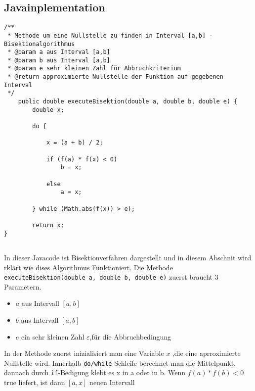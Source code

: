 \subsection{Javainplementation}
\begin{verbatim}
/**
 * Methode um eine Nullstelle zu finden in Interval [a,b] - Bisektionalgorithmus
 * @param a aus Interval [a,b]
 * @param b aus Interval [a,b]
 * @param e sehr kleinen Zahl für Abbruchkriterium
 * @return approximierte Nullstelle der Funktion auf gegebenen Interval
 */
	public double executeBisektion(double a, double b, double e) {
		double x;

		do {

			x = (a + b) / 2;

			if (f(a) * f(x) < 0)
				b = x;

			else
				a = x;

		} while (Math.abs(f(x)) > e);

		return x;
}
 
\end{verbatim}
In dieser Javacode ist Bisektionverfahren dargestellt und  in diesem Abschnit wird rklärt wie dises Algorithmus Funktioniert.
Die Methode \verb|executeBisektion(double a, double b, double e)| zuerst braucht 3 Parametern.
\begin{itemize}
\item $a$ aus Intervall $[a,b]$
\item $b$ aus Intervall $[a,b]$
\item $e$ ein sehr kleinen Zahl $\varepsilon$,für die Abbruchbedingung 
\end{itemize}                      
In der Methode zuerst inizialisiert man eine Variable $x$ ,die eine aprroximierte Nullstelle wird. Innerhalb \verb|do/while| Schleife berechnet man die Mittelpunkt, dannach durch \verb|if|-Bedigung klebt es x in a oder in b. Wenn $f(a) * f(b) < 0$ true liefert, ist dann $[a,x]$ neuen Intervall






